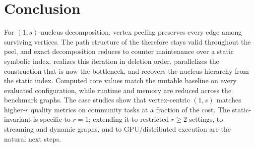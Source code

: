 \section{Conclusion}\label{sec:conclusion}

For $(1,s)$-nucleus decomposition, vertex peeling preserves every edge among surviving vertices.
%
The path structure of the \cpi{} therefore stays valid throughout the peel, and exact decomposition reduces to counter maintenance over a static symbolic index.
%
\spinStar{} realizes this iteration in deletion order, \paraBuild{} parallelizes the construction that is now the bottleneck, and \buildHier{} recovers the nucleus hierarchy from the static index.
%
Computed core values match the mutable baseline on every evaluated configuration, while runtime and memory are reduced across the benchmark graphs.
%
The case studies show that vertex-centric $(1,s)$ matches higher-$r$ quality metrics on community tasks at a fraction of the cost.
%
The static-\cpi{} invariant is specific to $r{=}1$; extending it to restricted $r\!\ge\!2$ settings, to streaming and dynamic graphs, and to GPU/distributed execution are the natural next steps.
